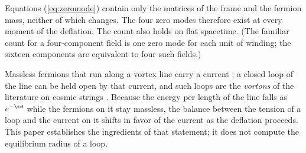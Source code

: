Equations (\ref{eq:zeromode}) contain only the matrices of the frame and the fermion mass, neither of
which changes. The four zero modes therefore exist at every moment of the deflation. The count also
holds on flat spacetime. (The familiar count for a four-component field is one zero mode for each
unit of winding; the sixteen components are equivalent to four such fields.)

Massless fermions that run along a vortex line carry a current \cite{Witten1985}; a closed loop of
the line can be held open by that current, and such loops are the \emph{vortons} of the literature
on cosmic strings \cite{DavisShellard1989}. Because the energy per length of the line falls as
$e^{-\td}$ while the fermions on it stay massless, the balance between the tension of a loop and the
current on it shifts in favor of the current as the deflation proceeds. This paper establishes the
ingredients of that statement; it does not compute the equilibrium radius of a loop.

